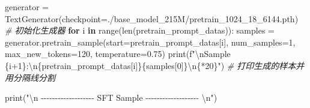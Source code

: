 \documentclass[
]{article}
\newenvironment{Shaded}{}{}
\newcommand{\BuiltInTok}[1]{\textcolor[rgb]{0.00,0.50,0.00}{#1}}
\newcommand{\CharTok}[1]{\textcolor[rgb]{0.25,0.44,0.63}{#1}}
\newcommand{\CommentTok}[1]{\textcolor[rgb]{0.38,0.63,0.69}{\textit{#1}}}
\newcommand{\ControlFlowTok}[1]{\textcolor[rgb]{0.00,0.44,0.13}{\textbf{#1}}}
\newcommand{\DecValTok}[1]{\textcolor[rgb]{0.25,0.63,0.44}{#1}}
\newcommand{\FloatTok}[1]{\textcolor[rgb]{0.25,0.63,0.44}{#1}}
\newcommand{\KeywordTok}[1]{\textcolor[rgb]{0.00,0.44,0.13}{\textbf{#1}}}
\newcommand{\NormalTok}[1]{#1}
\newcommand{\OperatorTok}[1]{\textcolor[rgb]{0.40,0.40,0.40}{#1}}
\newcommand{\SpecialCharTok}[1]{\textcolor[rgb]{0.25,0.44,0.63}{#1}}
\newcommand{\SpecialStringTok}[1]{\textcolor[rgb]{0.73,0.40,0.53}{#1}}
\newcommand{\StringTok}[1]{\textcolor[rgb]{0.25,0.44,0.63}{#1}}
\begin{document}
\begin{Shaded}
\begin{Highlighting}[]
\NormalTok{    generator }\OperatorTok{=}\NormalTok{ TextGenerator(checkpoint}\OperatorTok{=}\StringTok{\textquotesingle{}./base\_model\_215M/pretrain\_1024\_18\_6144.pth\textquotesingle{}}\NormalTok{)  }\CommentTok{\# 初始化生成器}
    \ControlFlowTok{for}\NormalTok{ i }\KeywordTok{in} \BuiltInTok{range}\NormalTok{(}\BuiltInTok{len}\NormalTok{(pretrain\_prompt\_datas)):}
\NormalTok{        samples }\OperatorTok{=}\NormalTok{ generator.pretrain\_sample(start}\OperatorTok{=}\NormalTok{pretrain\_prompt\_datas[i], num\_samples}\OperatorTok{=}\DecValTok{1}\NormalTok{, max\_new\_tokens}\OperatorTok{=}\DecValTok{120}\NormalTok{, temperature}\OperatorTok{=}\FloatTok{0.75}\NormalTok{)}
        \BuiltInTok{print}\NormalTok{(}\SpecialStringTok{f"}\CharTok{\textbackslash{}n}\SpecialStringTok{Sample }\SpecialCharTok{\{}\NormalTok{i}\OperatorTok{+}\DecValTok{1}\SpecialCharTok{\}}\SpecialStringTok{:}\CharTok{\textbackslash{}n}\SpecialCharTok{\{}\NormalTok{pretrain\_prompt\_datas[i]}\SpecialCharTok{\}\{}\NormalTok{samples[}\DecValTok{0}\NormalTok{]}\SpecialCharTok{\}}\CharTok{\textbackslash{}n}\SpecialCharTok{\{}\StringTok{\textquotesingle{}{-}\textquotesingle{}}\OperatorTok{*}\DecValTok{20}\SpecialCharTok{\}}\SpecialStringTok{"}\NormalTok{)  }\CommentTok{\# 打印生成的样本并用分隔线分割}

    \BuiltInTok{print}\NormalTok{(}\StringTok{"}\CharTok{\textbackslash{}n}\StringTok{ {-}{-}{-}{-}{-}{-}{-}{-}{-}{-}{-}{-}{-}{-}{-}{-}{-}{-}{-} SFT Sample {-}{-}{-}{-}{-}{-}{-}{-}{-}{-}{-}{-}{-}{-}{-}{-}{-}{-}{-} }\CharTok{\textbackslash{}n}\StringTok{"}\NormalTok{)}


\end{Highlighting}
\end{Shaded}
\end{document}
